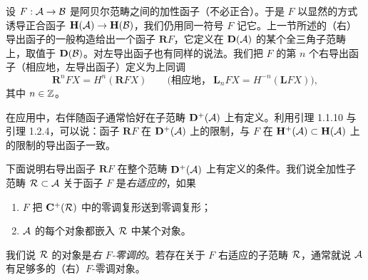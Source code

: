 
设 $F:\mathcal{A}\to\mathcal{B}$ 是阿贝尔范畴之间的加性函子（不必正合）。于是 $F$ 以显然的方式诱导正合函子 $\mathbf{H}(\mathcal{A})\to\mathbf{H}(\mathcal{B})$，我们仍用同一符号 $F$ 记它。上一节所述的（右）导出函子的一般构造给出一个函子 $\mathbf{R}F$，它定义在 $\mathbf{D}(\mathcal{A})$ 的某个全三角子范畴上，取值于 $\mathbf{D}(\mathcal{B})$。对左导出函子也有同样的说法。我们把 $F$ 的第 $n$ 个右导出函子（相应地，左导出函子）定义为上同调
\begin{equation*}
\mathbf{R}^{n}FX=H^{n}(\mathbf{R}FX)\qquad\bigl(\text{相应地，}\ \mathbf{L}_{n}FX=H^{-n}(\mathbf{L}FX)\bigr),
\end{equation*}
其中 $n\in\mathbb{Z}$。

在应用中，右伴随函子通常恰好在子范畴 $\mathbf{D}^{+}(\mathcal{A})$ 上有定义。利用引理 1.1.10 与引理 1.2.4，可以说：函子 $\mathbf{R}F$ 在 $\mathbf{D}^{+}(\mathcal{A})$ 上的限制，与 $F$ 在 $\mathbf{H}^{+}(\mathcal{A})\subset\mathbf{H}(\mathcal{A})$ 上的限制的导出函子一致。

下面说明右导出函子 $\mathbf{R}F$ 在整个范畴 $\mathbf{D}^{+}(\mathcal{A})$ 上有定义的条件。我们说全加性子范畴 $\mathcal{R}\subset\mathcal{A}$ 关于函子 $F$ 是\emph{右适应的}，如果
\begin{enumerate}[label=\alph*),leftmargin=2.4em,itemsep=1pt,topsep=2pt]
\item $F$ 把 $\mathbf{C}^{+}(\mathcal{R})$ 中的零调复形送到零调复形；
\item $\mathcal{A}$ 的每个对象都嵌入 $\mathcal{R}$ 中某个对象。
\end{enumerate}

我们说 $\mathcal{R}$ 的对象是\emph{右 $F$-零调的}。若存在关于 $F$ 右适应的子范畴 $\mathcal{R}$，通常就说 $\mathcal{A}$ 有足够多的（右）$F$-零调对象。


